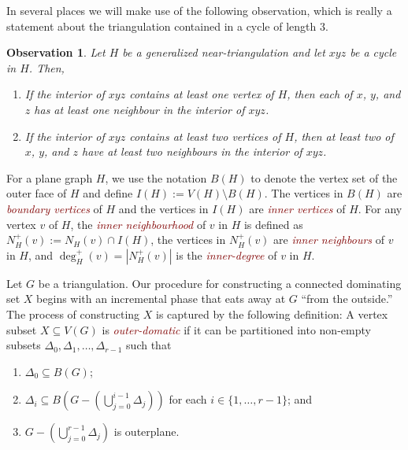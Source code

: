 \documentclass[a4paper,UKenglish, cleveref, autoref, thm-restate]{lipics-v2021}
\newtheorem{obs}{Observation}
\newcommand{\defin}[1]{\emph{\textcolor{Maroon}{#1}}}
\begin{document}
In several places we will make use of the following observation, which is really a statement about the triangulation contained in a cycle of length $3$.
\begin{obs}\label{useful_little_guy}
  Let $H$ be a generalized near-triangulation and let $xyz$ be a cycle in $H$.  Then,
  \begin{enumerate}
    \item If the interior of $xyz$ contains at least one vertex of $H$, then each of $x$, $y$, and $z$ has at least one neighbour in the interior of $xyz$.

    \item If the interior of $xyz$ contains at least two vertices of $H$, then at least two of $x$, $y$, and $z$ have at least two neighbours in the interior of $xyz$.
  \end{enumerate}
\end{obs}

For a plane graph $H$, we use the notation $B(H)$ to denote the vertex set of the outer face of $H$ and define $I(H):=V(H)\setminus B(H)$.  The vertices in $B(H)$ are \defin{boundary vertices} of $H$ and the vertices in $I(H)$ are \defin{inner vertices} of $H$. For any vertex $v$ of $H$, the \defin{inner neighbourhood} of $v$ in $H$ is defined as $N_H^+(v):=N_H(v)\cap I(H)$, the vertices in $N^+_H(v)$ are \defin{inner neighbours} of $v$ in $H$, and $\deg^+_H(v)=|N^+_H(v)|$ is the \defin{inner-degree} of $v$ in $H$.

Let $G$ be a triangulation.  Our procedure for constructing a connected dominating set $X$ begins with an incremental phase that eats away at $G$ ``from the outside.'' The process of constructing $X$ is captured by the following definition:   A vertex subset $X\subseteq V(G)$ is \defin{outer-domatic} if it can be partitioned into non-empty subsets $\Delta_0,\Delta_1,\ldots,\Delta_{r-1}$ such that
\begin{enumerate}[(P1)]
    \item $\Delta_0\subseteq B(G)$; \label{outer_face}
    \item $\Delta_i\subseteq B(G-(\bigcup_{j=0}^{i-1}\Delta_j))$ for each $i\in\{1,\ldots,r-1\}$; and \label{incremental}
    \item $G-(\bigcup_{j=0}^{r-1}\Delta_j)$ is outerplane. \label{outerplanar}
\end{enumerate}
\end{document}

